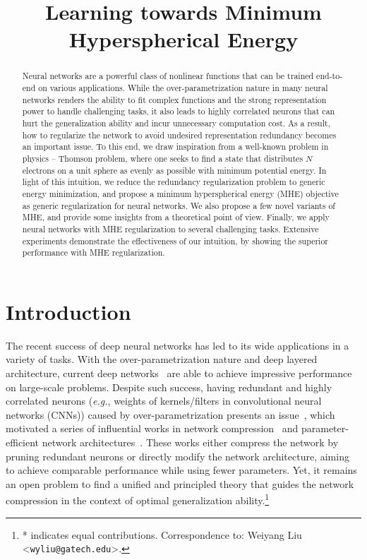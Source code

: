 \title{Learning towards Minimum Hyperspherical Energy}

\begin{abstract}
Neural networks are a powerful class of nonlinear functions that can be trained end-to-end on various applications. While the over-parametrization nature in many neural networks renders the ability to fit complex functions and the strong representation power to handle challenging tasks, it also leads to highly correlated neurons that can hurt the generalization ability and incur unnecessary computation cost. As a result, how to regularize the network to avoid undesired representation redundancy becomes an important issue. To this end, we draw inspiration from a well-known problem in physics -- Thomson problem, where one seeks to find a state that distributes $N$ electrons on a unit sphere as evenly as possible with minimum potential energy. In light of this intuition, we reduce the redundancy regularization problem to generic energy minimization, and propose a minimum hyperspherical energy (MHE) objective as generic regularization for neural networks. We also propose a few novel variants of MHE, and provide some insights from a theoretical point of view. Finally, we apply neural networks with MHE regularization to several challenging tasks. Extensive experiments demonstrate the effectiveness of our intuition, by showing the superior performance with MHE regularization.
\end{abstract}

\section{Introduction}

The recent success of deep neural networks has led to its wide applications in a variety of tasks. With the over-parametrization nature and deep layered architecture, current deep networks~\cite{he2015deep,szegedy2015going,simonyan2014very} are able to achieve impressive performance on large-scale problems. Despite such success, having redundant and highly correlated neurons (\emph{e.g.}, weights of kernels/filters in convolutional neural networks (CNNs)) caused by over-parametrization presents an issue~\cite{roychowdhury2018reducing,shang2016understanding}, which motivated a series of influential works in network compression~\cite{han2015deep,aghasi2016net} and parameter-efficient network architectures~\cite{howard2017mobilenets,iandola2016squeezenet,zhang2017shufflenet}. These works either compress the network by pruning redundant neurons or directly modify the network architecture, aiming to achieve comparable performance while using fewer parameters. Yet, it remains an open problem to find a unified and principled theory that guides the network compression in the context of optimal generalization ability.\footnote{* indicates equal contributions. Correspondence to: Weiyang Liu <\texttt{wyliu@gatech.edu}>.}

